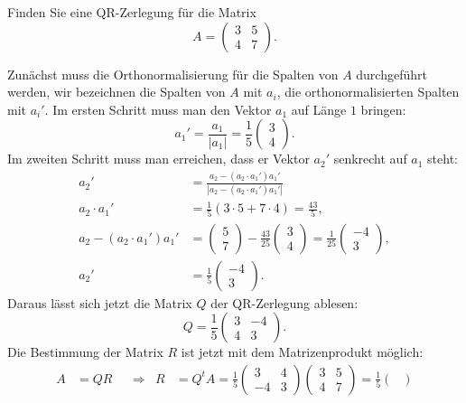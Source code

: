 Finden Sie eine QR-Zerlegung für die Matrix
\[
A=\begin{pmatrix}
3&5\\
4&7
\end{pmatrix}.
\]

\begin{loesung}
Zunächst muss die Orthonormalisierung für die Spalten von $A$
durchgeführt werden, wir bezeichnen die Spalten von $A$ mit $a_i$,
die orthonormalisierten Spalten mit $a_i'$. Im ersten Schritt muss man
den Vektor $a_1$ auf Länge $1$ bringen:
\[
a_1'=\frac{a_1}{|a_1|}=\frac15\begin{pmatrix}3\\4\end{pmatrix}.
\]
Im zweiten Schritt muss man erreichen, dass er Vektor $a_2'$ senkrecht
auf $a_1$ steht:
\begin{align*}
a_2'&=\frac{a_2-(a_2\cdot a_1')a_1'}{|a_2-(a_2\cdot a_1')a_1'|}\\
a_2\cdot a_1'&=\frac15(3\cdot 5+7\cdot 4)=\frac{43}{5},\\
a_2-(a_2\cdot a_1')a_1'&=
\begin{pmatrix}5\\7\end{pmatrix}
-\frac{43}{25}\begin{pmatrix}3\\4\end{pmatrix}
=\frac{1}{25}\begin{pmatrix}-4\\3\end{pmatrix},
\\
a_2'&=\frac15\begin{pmatrix}-4\\3\end{pmatrix}.
\end{align*}
Daraus lässt sich jetzt die Matrix $Q$ der QR-Zerlegung ablesen:
\[
Q=\frac15
\begin{pmatrix}
3&-4\\
4& 3
\end{pmatrix}.
\]
Die Bestimmung der Matrix $R$ ist jetzt mit dem Matrizenprodukt möglich:
\begin{align*}
A&=QR&&\Rightarrow&R&=Q^tA=\frac15\begin{pmatrix}3&4\\-4&3\end{pmatrix}
\begin{pmatrix}3&5\\4&7\end{pmatrix}
=\frac15\begin{pmatrix}

\end{pmatrix}
\end{align*}
\end{loesung}
